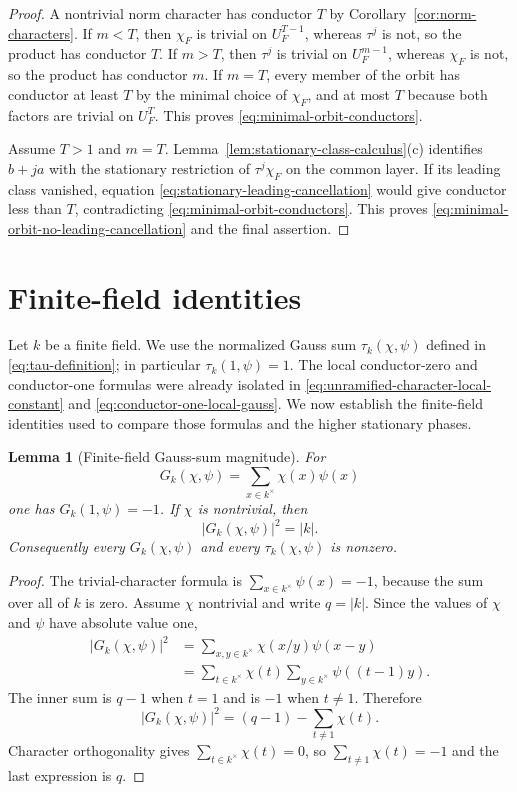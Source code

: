 \documentclass[11pt]{amsart}
\newtheorem{lemma}[theorem]{Lemma}
\theoremstyle{definition}
\theoremstyle{remark}
\begin{document}
\begin{proof}
A nontrivial norm character has conductor $T$ by
Corollary~\ref{cor:norm-characters}.  If $m<T$, then $\chi_F$ is trivial
on $U_F^{T-1}$, whereas $\tau^j$ is not, so the product has conductor
$T$.  If $m>T$, then $\tau^j$ is trivial on $U_F^{m-1}$, whereas
$\chi_F$ is not, so the product has conductor $m$.  If $m=T$, every
member of the orbit has conductor at least $T$ by the minimal choice of
$\chi_F$, and at most $T$ because both factors are trivial on $U_F^T$.
This proves \eqref{eq:minimal-orbit-conductors}.

Assume $T>1$ and $m=T$.  Lemma~\ref{lem:stationary-class-calculus}(c)
identifies $b+ja$ with the stationary restriction of
$\tau^j\chi_F$ on the common layer.  If its leading class vanished,
equation \eqref{eq:stationary-leading-cancellation} would give
conductor less than $T$, contradicting
\eqref{eq:minimal-orbit-conductors}.  This proves
\eqref{eq:minimal-orbit-no-leading-cancellation} and the final
assertion.
\end{proof}

\section{Finite-field identities}

Let $k$ be a finite field.  We use the normalized Gauss sum
$\tau_k(\chi,\psi)$ defined in \eqref{eq:tau-definition}; in
particular $\tau_k(1,\psi)=1$.  The local conductor-zero and
conductor-one formulas were already isolated in
\eqref{eq:unramified-character-local-constant} and
\eqref{eq:conductor-one-local-gauss}.  We now establish the finite-field
identities used to compare those formulas and the higher stationary phases.

\begin{lemma}[Finite-field Gauss-sum magnitude]
\label{lem:finite-gauss-magnitude}
For
\[
 G_k(\chi,\psi)=\sum_{x\in k^\times}\chi(x)\psi(x)
\]
one has $G_k(1,\psi)=-1$.  If $\chi$ is nontrivial, then
\begin{equation}\label{eq:finite-gauss-magnitude}
 |G_k(\chi,\psi)|^2=|k|.
\end{equation}
Consequently every $G_k(\chi,\psi)$ and every
$\tau_k(\chi,\psi)$ is nonzero.
\end{lemma}

\begin{proof}
The trivial-character formula is
$\sum_{x\in k^\times}\psi(x)=-1$, because the sum over all of $k$ is
zero.  Assume $\chi$ nontrivial and write $q=|k|$.  Since the values of
$\chi$ and $\psi$ have absolute value one,
\[
 \begin{aligned}
 |G_k(\chi,\psi)|^2
 &=\sum_{x,y\in k^\times}\chi(x/y)\psi(x-y)\\
 &=\sum_{t\in k^\times}\chi(t)
       \sum_{y\in k^\times}\psi((t-1)y).
 \end{aligned}
\]
The inner sum is $q-1$ when $t=1$ and is $-1$ when $t\ne1$.
Therefore
\[
 |G_k(\chi,\psi)|^2
 =(q-1)-\sum_{t\ne1}\chi(t).
\]
Character orthogonality gives $\sum_{t\in k^\times}\chi(t)=0$, so
$\sum_{t\ne1}\chi(t)=-1$ and the last expression is $q$.
\end{proof}
\end{document}
